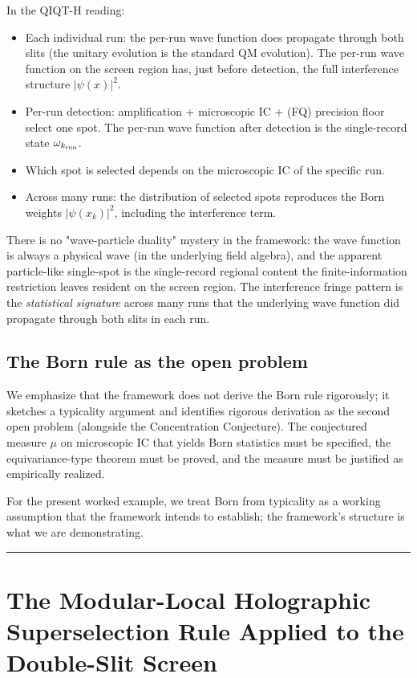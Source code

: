 \documentclass[11pt,a4paper]{article}
\begin{document}
In the QIQT-H reading:

\begin{itemize}
  \item Each individual run: the per-run wave function does propagate through both slits (the unitary evolution is the standard QM evolution). The per-run wave function on the screen region has, just before detection, the full interference structure $|\psi(x)|^2$.
  \item Per-run detection: amplification + microscopic IC + (FQ) precision floor select one spot. The per-run wave function after detection is the single-record state $\omega_{k_{\rm run}}$.
  \item Which spot is selected depends on the microscopic IC of the specific run.
  \item Across many runs: the distribution of selected spots reproduces the Born weights $|\psi(x_k)|^2$, including the interference term.
\end{itemize}

There is no "wave-particle duality" mystery in the framework: the wave function is always a physical wave (in the underlying field algebra), and the apparent particle-like single-spot is the single-record regional content the finite-information restriction leaves resident on the screen region. The interference fringe pattern is the \emph{statistical signature} across many runs that the underlying wave function did propagate through both slits in each run.

\subsection{The Born rule as the open problem}

We emphasize that the framework does not derive the Born rule rigorously; it sketches a typicality argument and identifies rigorous derivation as the second open problem (alongside the Concentration Conjecture). The conjectured measure $\mu$ on microscopic IC that yields Born statistics must be specified, the equivariance-type theorem must be proved, and the measure must be justified as empirically realized.

For the present worked example, we treat Born from typicality as a working assumption that the framework intends to establish; the framework's structure is what we are demonstrating.

\medskip\hrule\medskip

\section{The Modular-Local Holographic Superselection Rule Applied to the Double-Slit Screen}
\end{document}
